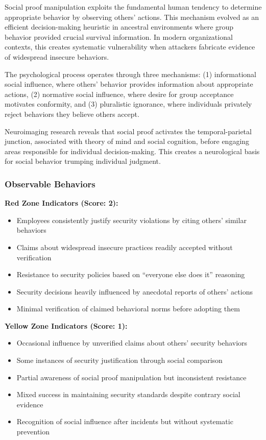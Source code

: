 \documentclass[11pt,a4paper]{article}
\begin{document}
Social proof manipulation exploits the fundamental human tendency to determine appropriate behavior by observing others' actions. This mechanism evolved as an efficient decision-making heuristic in ancestral environments where group behavior provided crucial survival information. In modern organizational contexts, this creates systematic vulnerability when attackers fabricate evidence of widespread insecure behaviors.

The psychological process operates through three mechanisms: (1) informational social influence, where others' behavior provides information about appropriate actions, (2) normative social influence, where desire for group acceptance motivates conformity, and (3) pluralistic ignorance, where individuals privately reject behaviors they believe others accept\cite{asch1956}.

Neuroimaging research reveals that social proof activates the temporal-parietal junction, associated with theory of mind and social cognition, before engaging areas responsible for individual decision-making. This creates a neurological basis for social behavior trumping individual judgment.

\subsubsection{Observable Behaviors}

\textbf{Red Zone Indicators (Score: 2):}
\begin{itemize}
\item Employees consistently justify security violations by citing others' similar behaviors
\item Claims about widespread insecure practices readily accepted without verification
\item Resistance to security policies based on ``everyone else does it'' reasoning
\item Security decisions heavily influenced by anecdotal reports of others' actions
\item Minimal verification of claimed behavioral norms before adopting them
\end{itemize}

\textbf{Yellow Zone Indicators (Score: 1):}
\begin{itemize}
\item Occasional influence by unverified claims about others' security behaviors
\item Some instances of security justification through social comparison
\item Partial awareness of social proof manipulation but inconsistent resistance
\item Mixed success in maintaining security standards despite contrary social evidence
\item Recognition of social influence after incidents but without systematic prevention
\end{itemize}
\end{document}

